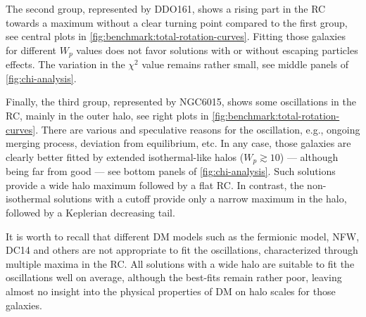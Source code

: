 The second group, represented by DDO161, shows a rising part in the RC towards a maximum without a clear turning point compared to the first group, see central plots in \cref{fig:benchmark:total-rotation-curves}. Fitting those galaxies for different $W_p$ values does not favor solutions with or without escaping particles effects. The variation in the $\chi^2$ value remains rather small, see middle panels of \cref{fig:chi-analysis}.

Finally, the third group, represented by NGC6015, shows some oscillations in the RC, mainly in the outer halo, see right plots in \cref{fig:benchmark:total-rotation-curves}. There are various and speculative reasons for the oscillation, e.g., ongoing merging process, deviation from equilibrium, etc. In any case, those galaxies are clearly better fitted by extended isothermal-like halos ($W_p \gtrsim 10$) --- although being far from good --- see bottom panels of \cref{fig:chi-analysis}. Such solutions provide a wide halo maximum followed by a flat RC. In contrast, the non-isothermal solutions with a cutoff provide only a narrow maximum in the halo, followed by a Keplerian decreasing tail.

It is worth to recall that different DM models such as the fermionic model, NFW, DC14 and others are not appropriate to fit the oscillations, characterized through multiple maxima in the RC. All solutions with a wide halo are suitable to fit the oscillations well on average, although the best-fits remain rather poor, leaving almost no insight into the physical properties of DM on halo scales for those galaxies.
